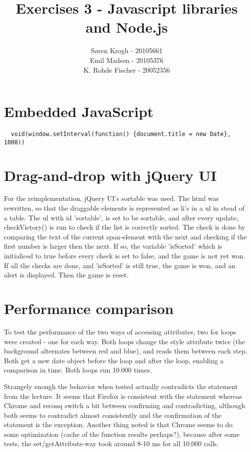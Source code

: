 \documentclass[a4paper,10pt]{article}
\author{
Søren Krogh -  20105661 \\
Emil Madsen - 20105376  \\
K. Rohde Fischer - 20052356\\}
\title{Exercises 3 - Javascript libraries and Node.js}
\begin{document}
\maketitle

\section*{Embedded JavaScript}

\begin{verbatim}
  void(window.setInterval(function() {document.title = new Date}, 1000))
\end{verbatim}


\section*{Drag-and-drop with jQuery UI}
For the reimplementation, jQuery UI's sortable was used.
The html was rewritten, so that the draggable elements is represented as li's in a ul in stead of a table.
The ul with id 'sortable', is set to be sortable, and after every update, checkVictory() is run to check if the list is correctly sorted.
The check is done by comparing the text of the current span-element with the next and checking if the first number is larger then the next. If so, the variable 'isSorted' which is initialiced to true before every check is set to false, and the game is not yet won.
If all the checks are done, and 'isSorted' is still true, the game is won, and an alert is displayed. Then the game is reset.

\section*{Performance comparison}
To test the performance of the two ways of accessing attributes, two
for loops were created - one for each way.  Both loops change the
style attribute twice (the background alternates between red and
blue), and reads them between each step.  Both get a new date object
before the loop and after the loop, enabling a comparison in time.
Both loops run 10.000 times.

Strangely enough the behavior when tested actually contradicts the
statement from the lecture.  It seems that Firefox is consistent with
the statement whereas Chrome and reconq switch a bit between
confirming and contradicting, although both seems to contradict almost
consistently and the confirmation of the statement is the exception.
Another thing noted is that Chrome seems to do some optimization
(cache of the function results perhaps?), because after some tests,
the set/getAttribute-way took around 8-10 ms for all 10.000 calls.
\end{document}

